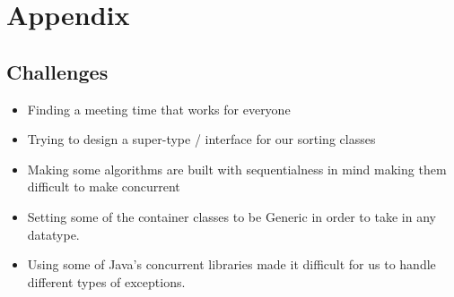 \documentclass{article}
\begin{document}
\section{Appendix}
\subsection{Challenges}
\begin{itemize}
  \item Finding a meeting time that works for everyone
  \item Trying to design a super-type / interface for our sorting classes
  \item Making some algorithms are built with sequentialness in mind making them difficult to make concurrent
  \item Setting some of the container classes to be Generic in order to take in any datatype.
  \item Using some of Java's concurrent libraries\cite{javalibs} made it difficult for us to handle different types of exceptions.
\end{itemize}
\printbibliography{}
\end{document}
